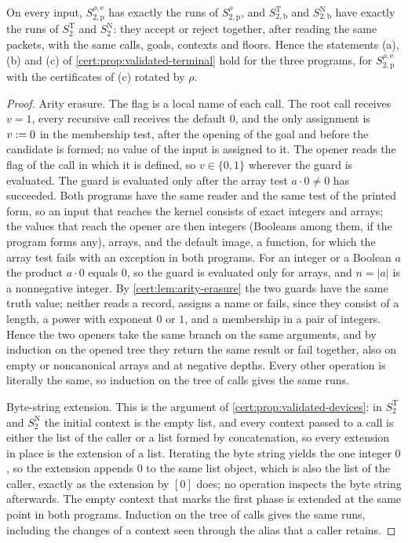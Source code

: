 \begin{proposition}\label{cert:prop:arity-erasure}
On every input, $S^{\rho,\mathrm e}_{2,\mathrm p}$ has exactly the runs of
$S^{\rho}_{2,\mathrm p}$, and $S^{\mathrm T}_{2,\mathrm b}$ and
$S^{\mathrm N}_{2,\mathrm b}$ have exactly the runs of $S^{\mathrm T}_2$ and
$S^{\mathrm N}_2$: they accept or reject together, after reading the same packets,
with the same calls, goals, contexts and floors. Hence the statements (a), (b) and
(c) of \cref{cert:prop:validated-terminal} hold for the three programs, for
$S^{\rho,\mathrm e}_{2,\mathrm p}$ with the certificates of (c) rotated by $\rho$.
\end{proposition}
\begin{proof}
Arity erasure. The flag is a local name of each call. The root call receives
$v=1$, every recursive call receives the default $0$, and the only assignment is
$v\mathrel{:=} 0$ in the membership test, after the opening of the goal and before the
candidate is formed; no value of the input is assigned to it. The opener reads the
flag of the call in which it is defined, so $v\in\{0,1\}$ wherever the guard is
evaluated. The guard is evaluated only after the array test $a\cdot 0\neq 0$ has
succeeded. Both programs have the same reader and the same test of the printed
form, so an input that reaches the kernel consists of exact integers and arrays;
the values that reach the opener are then integers (Booleans among them, if the
program forms any), arrays, and the default image, a function, for which the array
test fails with an exception in both programs. For an integer or a Boolean $a$ the product $a\cdot 0$
equals $0$, so the guard is evaluated only for arrays, and $n=\lvert a\rvert$ is a
nonnegative integer. By \cref{cert:lem:arity-erasure} the two guards have the same
truth value; neither reads a record, assigns a name or fails, since they consist
of a length, a power with exponent $0$ or $1$, and a membership in a pair of
integers. Hence the two openers take the same branch on the same arguments, and by
induction on the opened tree they return the same result or fail together, also on
empty or noncanonical arrays and at negative depths. Every other operation is
literally the same, so induction on the tree of calls gives the same runs.

Byte-string extension. This is the argument of \cref{cert:prop:validated-devices}:
in $S^{\mathrm T}_2$ and $S^{\mathrm N}_2$ the initial context is the empty list,
and every context passed to a call is either the list of the caller or a list
formed by concatenation, so every extension in place is the extension of a list.
Iterating the byte string yields the one integer $0$, so the extension appends $0$
to the same list object, which is also the list of the caller, exactly as the
extension by $[0]$ does; no operation inspects the byte string afterwards. The
empty context that marks the first phase is extended at the same point in both
programs. Induction on the tree of calls gives the same runs, including the
changes of a context seen through the alias that a caller retains.


\end{proof}
